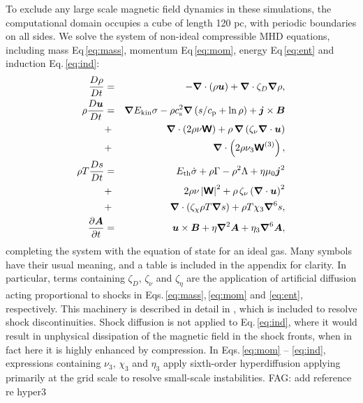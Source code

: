 \documentclass[preprint2]{aastex63}
\newcommand\ESK{E_{\rm kin}}
\newcommand\EST{E_{\rm th}}
\newcommand{\vect}[1]{{{\mbox{\boldmath $#1$}}}}%
\newcommand{\mathbfss}[1]{\textbf{\textsf{#1}}}
\newcommand{\fag}[1]{\textcolor{midgreen}{FAG: #1}}
\begin{document}
To exclude any large scale magnetic field dynamics in these simulations, the
computational domain occupies a cube of length 120 pc, with periodic boundaries
on all sides. 
We solve the system of non-ideal compressible MHD equations, including 
mass Eq\,\eqref{eq:mass}, momentum Eq\,\eqref{eq:mom}, energy Eq\,\eqref{eq:ent} and
induction Eq.\,\eqref{eq:ind}:
  \begin{eqnarray}
  \label{eq:mass}
    \frac{D\rho}{Dt} &=& 
    -\vect\nabla \cdot (\rho \vect{u})
    +\vect\nabla \cdot\zeta_D\vect\nabla\rho,\\
  \label{eq:mom}
    \rho\frac{D\vect{u}}{Dt} &=& 
    \vect\nabla{\ESK\sigma}
    -\rho c_{\rm s}^2\vect\nabla\left({s}/{c_{\rm p}}+\ln\rho\right)
    +\vect{j}\times\vect{B}
    \nonumber\\
    &+&\vect\nabla\cdot \left(2\rho\nu{\mathbfss W}\right)
    +\rho\,\vect\nabla\left(\zeta_{\nu}\vect\nabla \cdot \vect{u} \right)
    \nonumber\\
    &+&\vect\nabla\cdot \left(2\rho\nu_3{\mathbfss W}^{(3)}\right),\\
  \label{eq:ent}
    \rho T\frac{D s}{Dt} &=&
     \EST\dot\sigma +\rho\Gamma
    -\rho^2\Lambda +\eta\mu_0\vect{j}^2 
    \nonumber\\
    &+&2 \rho \nu\left|{\mathbfss W}\right|^{2}
    +\rho\,\zeta_{\nu}\left(\vect\nabla \cdot \vect{u} \right)^2
    \nonumber\\
    &+&\vect\nabla\cdot\left(\zeta_\chi\rho T\vect\nabla s\right)
    +\rho T\chi_3\vect\nabla^6 s,\\
  \label{eq:ind}
    \frac{\partial \vect{A}}{\partial t} &=&
    \vect{u}\times\vect{B}
    +\eta\vect\nabla^2\vect{A}
    +\eta_3\vect\nabla^6\vect{A},
  \end{eqnarray}
completing the system with the equation of state for an ideal gas.
Many symbols have their usual meaning, and a table is included in the appendix
for clarity.
In particular, terms containing $\zeta_D,\,\zeta_\nu$ and $\zeta_\eta$ are the
application of artificial diffusion acting proportional to shocks in 
Eqs.\,\eqref{eq:mass},\,\eqref{eq:mom} and \eqref{eq:ent}, respectively.
This machinery is described in detail in \citet{GMKSH20}, which is included to
resolve shock discontinuities.
Shock diffusion is not applied to Eq.\,\eqref{eq:ind}, where it would result in 
unphysical dissipation of the magnetic field in the shock fronts, when in fact 
here it is highly enhanced by compression.
In Eqs.\,\eqref{eq:mom} -- \eqref{eq:ind}, expressions containing 
$\nu_3,\,\chi_3$ and $\eta_3$ apply sixth-order hyperdiffusion applying primarily
at the grid scale to resolve small-scale instabilities.
\fag{add reference re hyper3}
\end{document}
